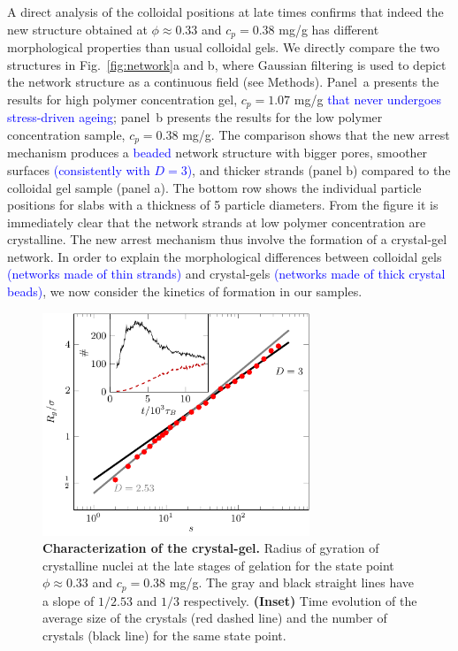 \documentclass[preprint,amsmath,amssymb,superscriptaddress]{revtex4-1}
\begin{document}
A direct analysis of the colloidal positions at late times confirms that indeed the new structure obtained at $\phi\approx 0.33$ and $c_p=0.38$ mg/g has different morphological properties than usual colloidal gels.
We directly compare the two structures in Fig.~\ref{fig:network}a and b, where Gaussian filtering is used to depict the network structure as a continuous field (see Methods).
Panel~a presents the results for high polymer concentration gel, $c_p=1.07$ mg/g \textcolor{blue}{that never undergoes stress-driven ageing}; panel~b presents the results for the low polymer concentration sample, $c_p=0.38$ mg/g.
The comparison shows that the new arrest mechanism produces a \textcolor{blue}{beaded} network structure with bigger pores, smoother surfaces \textcolor{blue}{(consistently with $D=3$)}, and thicker strands (panel b) compared 
to the colloidal gel sample (panel a). The bottom row shows the individual particle positions for slabs with a thickness of 5 particle diameters. 
From the figure it is immediately clear that the network strands at low polymer concentration are crystalline. The new arrest mechanism thus
involve the formation of a crystal-gel network. In order to explain the morphological differences between colloidal gels \textcolor{blue}{(networks made of thin strands)} and crystal-gels \textcolor{blue}{(networks made of thick crystal beads)},
we now consider the kinetics of formation in our samples. 

\begin{figure}
 \includegraphics[width=8cm]{characterisation}
\caption{{\bf Characterization of the crystal-gel.} 
Radius of gyration of crystalline nuclei at the late stages of gelation for the state point $\phi\approx 0.33$ and $c_p=0.38$ mg/g.
The gray and black straight lines have a slope of $1/2.53$ and $1/3$ respectively. 
\textbf{(Inset)} Time evolution of the average size of the crystals (red dashed line) and the number of crystals 
(black line) for the same state point.
} 
 \label{fig:crystals}
\end{figure}
\end{document}
